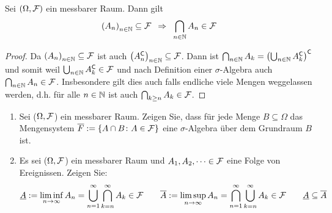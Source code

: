 \begin{exercisePage}
    \begin{lemma} \label{lemma: 1_1.1_schnitt}
        Sei $(\Omega, \mathcal{F})$ ein messbarer Raum. Dann gilt
        \begin{equation*}
            \folge{A_n} \subseteq \ereignisF \follows \bigcap_{n \in \N} A_n \in \ereignisF
        \end{equation*}
    \end{lemma}
    \begin{proof}
        Da $\folge{A_n} \subseteq \ereignisF$ ist auch $\folge{A_n^\complement} \subseteq \ereignisF$. Dann ist $\bigcap_{n \in \mathbb{N}} A_k = \left( \bigcup_{n \in \mathbb{N}} A_k^{\mathsf{C}} \right)^{\mathsf{C}}$ und somit weil $\bigcup_{n \in \mathbb{N}} A_k^{\mathsf{C}} \in \mathcal{F}$ und nach Definition einer $\sigma$-Algebra auch $\bigcap_{n \in \mathbb{N}} A_n \in \mathcal{F}$. Insbesondere gilt dies auch falls endliche viele Mengen weggelassen werden, d.h. für alle $n \in \mathbb{N}$ ist auch $\bigcap_{k \geq n} A_k \in \mathcal{F}$.
    \end{proof}

    \begin{exercise}
        \begin{enumerate}[leftmargin=*, label=(\alph*)]
            \item Sei ($\Omega, \mathcal{F}$) ein messbarer Raum. Zeigen Sie, dass für jede Menge $B \subseteq \Omega$ das Mengensystem $\overline{F} \mathrel{:=} \left\{ A \cap B \colon A \in \mathcal{F} \right\}$ eine $\sigma$-Algebra über dem Grundraum $B$ ist.
            \item Es sei ($\Omega, \mathcal{F}$) ein messbarer Raum und $A_1, A_2, \dots \in \mathcal{F}$ eine Folge von Ereignissen. Zeigen Sie:
            \begin{equation*}
                \underline{A} \mathrel{:=} \liminf_{n \to \infty} A_n = \bigcup_{n=1}^\infty \bigcap_{k=n}^\infty A_k \in \mathcal{F} \qquad \overline{A} \mathrel{:=} \limsup_{n \to \infty} A_n = \bigcap_{n=1}^\infty \bigcup_{k=n}^\infty A_k \in \mathcal{F} \qquad \underline{A} \subseteq \overline{A}
            \end{equation*}
        \end{enumerate}
    \end{exercise}


\end{exercisePage}
